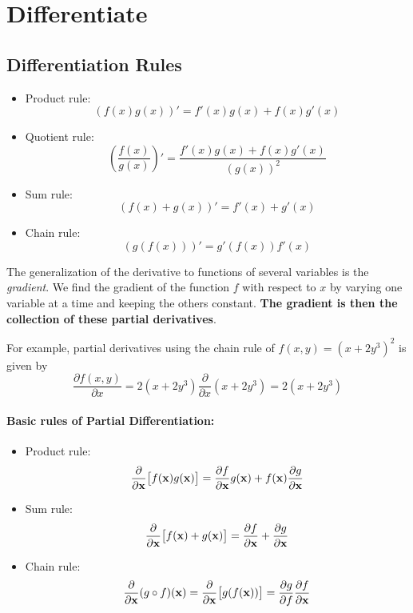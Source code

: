 \section{Differentiate}

\subsection{Differentiation Rules}

\begin{itemize}
	\item Product rule: 
		$$(f(x)g(x))' = f'(x)g(x)+f(x)g'(x)$$
	\item Quotient rule: 
		$$\left(\frac{f(x)}{g(x)}\right)' = \frac{f'(x)g(x)+f(x)g'(x)}{(g(x))^2}$$
	\item Sum rule: 
		$$(f(x)+g(x))' = f'(x)+g'(x)$$
	\item Chain rule:
		$$(g(f(x)))' = g'(f(x))f'(x)$$
\end{itemize}

The generalization of the derivative to functions of several variables is the \textit{gradient}. We find the gradient of the function $f$ with respect to $x$ by varying one variable at a time and keeping the others constant. \textbf{The gradient is then the collection of these partial derivatives}.

For example, partial derivatives using the chain rule of $f(x,y) = (x+2y^3)^2$ is given by
\[ \frac{\partial f(x, y)}{\partial x} = 2(x + 2y^3) \frac{\partial}{\partial x}(x + 2y^3) = 2(x + 2y^3) \]

\paragraph{Basic rules of Partial Differentiation:} 
\begin{itemize}
	\item Product rule:
	\[ \frac{\partial}{\partial {\mathbf{x}}} \big[f({\mathbf{x}})g({\mathbf{x}})\big] = \frac{\partial f}{\partial {\mathbf{x}}} g({\mathbf{x}}) + f({\mathbf{x}}) \frac{\partial g}{\partial {\mathbf{x}}} \]
	\item Sum rule:
	\[ \frac{\partial}{\partial {\mathbf{x}}} \big[f({\mathbf{x}}) + g({\mathbf{x}})\big] = \frac{\partial f}{\partial {\mathbf{x}}} + \frac{\partial g}{\partial {\mathbf{x}}} \]
	\item Chain rule:
	\[ \frac{\partial}{\partial {\mathbf{x}}} (g \circ f)({\mathbf{x}}) = \frac{\partial}{\partial {\mathbf{x}}} \big[g(f({\mathbf{x}}))\big] = \frac{\partial g}{\partial f} \frac{\partial f}{\partial {\mathbf{x}}} \]
\end{itemize}

